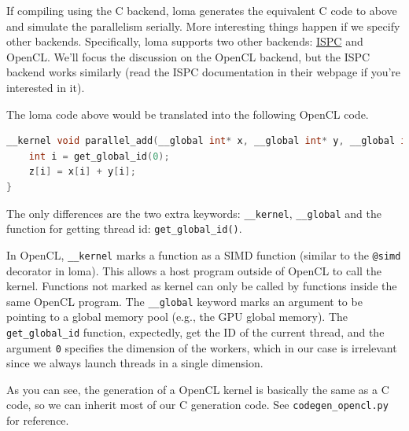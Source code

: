 If compiling using the C backend, loma generates the equivalent C code to above and simulate the parallelism serially. More interesting things happen if we specify other backends. Specifically, loma supports two other backends: \href{https://ispc.github.io/}{ISPC} and OpenCL. We'll focus the discussion on the OpenCL backend, but the ISPC backend works similarly (read the ISPC documentation in their webpage if you're interested in it).

The loma code above would be translated into the following OpenCL code.
\begin{lstlisting}[language=c]
__kernel void parallel_add(__global int* x, __global int* y, __global int* z) {
    int i = get_global_id(0);
    z[i] = x[i] + y[i];
}
\end{lstlisting}

The only differences are the two extra keywords: \lstinline{__kernel}, \lstinline{__global} and the function for getting thread id: \lstinline{get_global_id()}. 

In OpenCL, \lstinline{__kernel} marks a function as a SIMD function (similar to the \lstinline{@simd} decorator in loma). This allows a host program outside of OpenCL to call the kernel. Functions not marked as kernel can only be called by functions inside the same OpenCL program. The \lstinline{__global} keyword marks an argument to be pointing to a global memory pool (e.g., the GPU global memory). The \lstinline{get_global_id} function, expectedly, get the ID of the current thread, and the argument \lstinline{0} specifies the dimension of the workers, which in our case is irrelevant since we always launch threads in a single dimension. 

As you can see, the generation of a OpenCL kernel is basically the same as a C code, so we can inherit most of our C generation code. See \lstinline{codegen_opencl.py} for reference.

